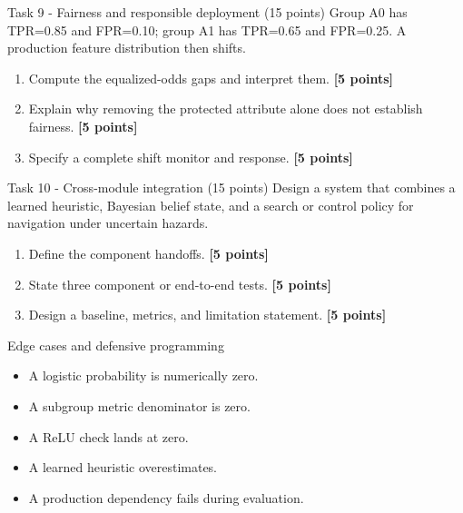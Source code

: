 \documentclass[aspectratio=169,11pt]{beamer}
\begin{document}
\begin{frame}{Task 9 - Fairness and responsible deployment (15 points)}
\small
Group A0 has TPR=0.85 and FPR=0.10; group A1 has TPR=0.65 and FPR=0.25. A production feature distribution then shifts.

\vspace{0.2cm}
\begin{enumerate}
\item[\textbf{a.}] Compute the equalized-odds gaps and interpret them. \hfill{\color{courseblue}\textbf{[5 points]}}
\item[\textbf{b.}] Explain why removing the protected attribute alone does not establish fairness. \hfill{\color{courseblue}\textbf{[5 points]}}
\item[\textbf{c.}] Specify a complete shift monitor and response. \hfill{\color{courseblue}\textbf{[5 points]}}
\end{enumerate}
\end{frame}

\begin{frame}{Task 10 - Cross-module integration (15 points)}
\small
Design a system that combines a learned heuristic, Bayesian belief state, and a search or control policy for navigation under uncertain hazards.

\vspace{0.2cm}
\begin{enumerate}
\item[\textbf{a.}] Define the component handoffs. \hfill{\color{courseblue}\textbf{[5 points]}}
\item[\textbf{b.}] State three component or end-to-end tests. \hfill{\color{courseblue}\textbf{[5 points]}}
\item[\textbf{c.}] Design a baseline, metrics, and limitation statement. \hfill{\color{courseblue}\textbf{[5 points]}}
\end{enumerate}
\end{frame}

\begin{frame}{Edge cases and defensive programming}
\small
\begin{itemize}
  \item A logistic probability is numerically zero.
  \item A subgroup metric denominator is zero.
  \item A ReLU check lands at zero.
  \item A learned heuristic overestimates.
  \item A production dependency fails during evaluation.
\end{itemize}
\end{frame}
\end{document}
